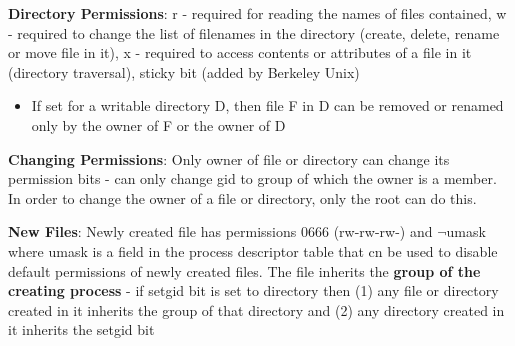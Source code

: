 \documentclass{article}
\begin{document}
\bigskip
\noindent
\textbf{Directory Permissions}: r - required for reading the names of files contained, w - required to change the list of filenames in the directory (create, delete, rename or move file in it), x - required to access contents or attributes of a file in it (directory traversal), sticky bit (added by Berkeley Unix)
\begin{itemize}
	\item If set for a writable directory D, then file F in D can be removed or renamed only by the owner of F or the owner of D
\end{itemize}

\bigskip
\noindent
\textbf{Changing Permissions}: Only owner of file or directory can change its permission bits - can only change gid to group of which the owner is a member. In order to change the owner of a file or directory, only the root can do this.

\bigskip
\noindent
\textbf{New Files}: Newly created file has permissions 0666 (rw-rw-rw-) and $\neg$umask where umask is a field in the process descriptor table that cn be used to disable default permissions of newly created files. The file inherits the \textbf{group of the creating process} - if setgid bit is set to directory then (1) any file or directory created in it inherits the group of that directory and (2) any directory created in it inherits the setgid bit
\end{document}
